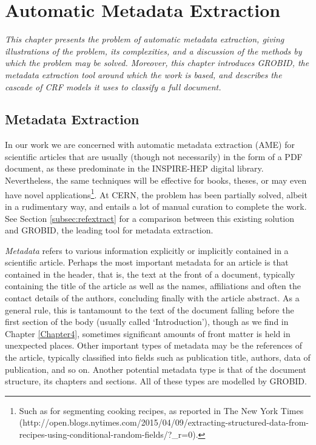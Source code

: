 
\chapter{Automatic Metadata Extraction} %

\label{Chapter3} %



\emph{This chapter presents the problem of automatic metadata extraction, giving illustrations of the problem, its complexities, and a discussion of the methods by which the problem may be solved. Moreover, this chapter introduces GROBID, the metadata extraction tool around which the work is based, and describes the cascade of CRF models it uses to classify a full document.}

\section{Metadata Extraction}

In our work we are concerned with automatic metadata extraction (AME) for scientific articles that are usually (though not necessarily) in the form of a PDF document, as these predominate in the INSPIRE-HEP digital library. Nevertheless, the same techniques will be effective for books, theses, or may even have novel applications\footnote{Such as for segmenting cooking recipes, as reported in The New York Times (http://open.blogs.nytimes.com/2015/04/09/extracting-structured-data-from-recipes-using-conditional-random-fields/?\_r=0).}. At CERN, the problem has been partially solved, albeit in a rudimentary way, and entails a lot of manual curation to complete the work. See Section \ref{subsec:refextract} for a comparison between this existing solution and GROBID, the leading tool for metadata extraction.

\emph{Metadata} refers to various information explicitly or implicitly contained in a scientific article. Perhaps the most important metadata for an article is that contained in the header, that is, the text at the front of a document, typically containing the title of the article as well as the names, affiliations and often the contact details of the authors, concluding finally with the article abstract. As a general rule, this is tantamount to the text of the document falling before the first section of the body (usually called `Introduction'), though as we find in Chapter \ref{Chapter4}, sometimes significant amounts of front matter is held in unexpected places. Other important types of metadata may be the references of the article, typically classified into fields such as publication title, authors, data of publication, and so on. Another potential metadata type is that of the document structure, its chapters and sections. All of these types are modelled by GROBID.

